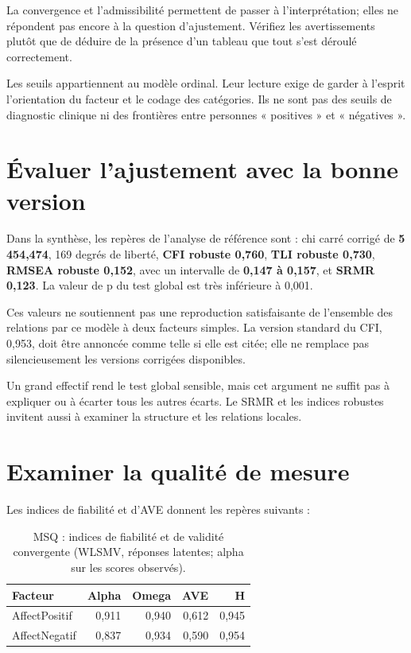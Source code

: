 \documentclass[
  french,
  11pt,
  a4paper,
  DIV=11,
  numbers=noendperiod]{scrreprt}
\begin{document}
La convergence et l'admissibilité permettent de passer à
l'interprétation; elles ne répondent pas encore à la question
d'ajustement. Vérifiez les avertissements plutôt que de déduire de la
présence d'un tableau que tout s'est déroulé correctement.

Les seuils appartiennent au modèle ordinal. Leur lecture exige de garder
à l'esprit l'orientation du facteur et le codage des catégories. Ils ne
sont pas des seuils de diagnostic clinique ni des frontières entre
personnes « positives » et « négatives ».

\section{Évaluer l'ajustement avec la bonne
version}\label{uxe9valuer-lajustement-avec-la-bonne-version}

Dans la synthèse, les repères de l'analyse de référence sont : chi carré
corrigé de \textbf{5\,454,474}, 169 degrés de liberté, \textbf{CFI
robuste 0,760}, \textbf{TLI robuste 0,730}, \textbf{RMSEA robuste
0,152}, avec un intervalle de \textbf{0,147 à 0,157}, et \textbf{SRMR
0,123}. La valeur de p du test global est très inférieure à 0,001.

Ces valeurs ne soutiennent pas une reproduction satisfaisante de
l'ensemble des relations par ce modèle à deux facteurs simples. La
version standard du CFI, 0,953, doit être annoncée comme telle si elle
est citée; elle ne remplace pas silencieusement les versions corrigées
disponibles.

Un grand effectif rend le test global sensible, mais cet argument ne
suffit pas à expliquer ou à écarter tous les autres écarts. Le SRMR et
les indices robustes invitent aussi à examiner la structure et les
relations locales.

\section{Examiner la qualité de
mesure}\label{examiner-la-qualituxe9-de-mesure}

Les indices de fiabilité et d'AVE donnent les repères suivants :


{

\begin{longtable}[]{@{}lrrrr@{}}

\caption{\label{tbl-msq-fiab}MSQ : indices de fiabilité et de validité
convergente (WLSMV, réponses latentes; alpha sur les scores observés).}

\tabularnewline

\toprule\noalign{}
Facteur & Alpha & Omega & AVE & H \\
\midrule\noalign{}
\endhead
\bottomrule\noalign{}
\endlastfoot
AffectPositif & 0,911 & 0,940 & 0,612 & 0,945 \\
AffectNegatif & 0,837 & 0,934 & 0,590 & 0,954 \\

\end{longtable}

}
\end{document}
